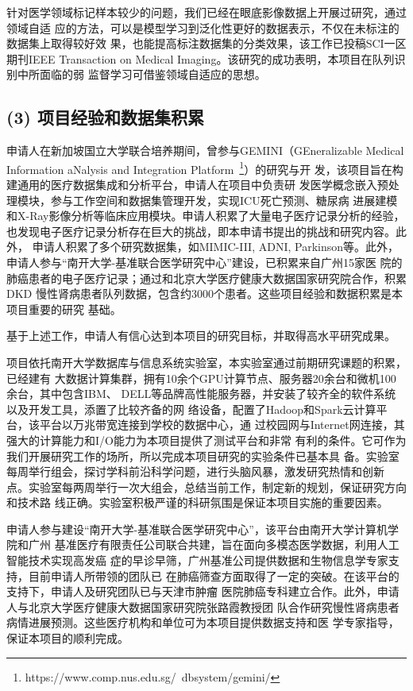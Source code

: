 \documentclass[a4paper,zihao=-4]{article}
\begin{document}
针对医学领域标记样本较少的问题，我们已经在眼底影像数据上开展过研究，通过领域自适
应的方法，可以是模型学习到泛化性更好的数据表示，不仅在未标注的数据集上取得较好效
果，也能提高标注数据集的分类效果，该工作已投稿{\kaishu SCI一区期刊IEEE
Transaction on Medical Imaging}。该研究的成功表明，本项目在队列识别中所面临的弱
监督学习可借鉴领域自适应的思想。

\subsection*{(3) 项目经验和数据集积累}

申请人在新加坡国立大学联合培养期间，曾参与GEMINI（GEneralizable Medical
Information aNalysis and Integration
Platform~\footnote{https://www.comp.nus.edu.sg/~dbsystem/gemini/}）的研究与开
发，该项目旨在构建通用的医疗数据集成和分析平台，{\kaishu 申请人在项目中负责研
发医学概念嵌入预处理模块，参与工作空间和数据集管理开发，实现ICU死亡预测、糖尿病
进展建模和X-Ray影像分析等临床应用模块}。申请人积累了大量电子医疗记录分析的经验，
也发现电子医疗记录分析存在巨大的挑战，即本申请书提出的挑战和研究内容。此外，
{\kaishu 申请人积累了多个研究数据集，如MIMIC-III, ADNI, Parkinson等}。此外，
{\kaishu 申请人参与“南开大学-基准联合医学研究中心”建设}，已积累来自广州15家医
院的肺癌患者的电子医疗记录；通过和北京大学医疗健康大数据国家研究院合作，积累DKD
慢性肾病患者队列数据，包含约3000个患者。这些项目经验和数据积累是本项目重要的研究
基础。

基于上述工作，申请人有信心达到本项目的研究目标，并取得高水平研究成果。


项目依托南开大学数据库与信息系统实验室，本实验室通过前期研究课题的积累，已经建有
大数据计算集群，拥有10余个GPU计算节点、服务器20余台和微机100余台，其中包含IBM、
DELL等品牌高性能服务器，并安装了较齐全的软件系统以及开发工具，添置了比较齐备的网
络设备，配置了Hadoop和Spark云计算平台，该平台以万兆带宽连接到学校的数据中心，通
过校园网与Internet网连接，其强大的计算能力和I/O能力为本项目提供了测试平台和非常
有利的条件。它可作为我们开展研究工作的场所，所以完成本项目研究的实验条件已基本具
备。实验室每周举行组会，探讨学科前沿科学问题，进行头脑风暴，激发研究热情和创新
点。实验室每两周举行一次大组会，总结当前工作，制定新的规划，保证研究方向和技术路
线正确。实验室积极严谨的科研氛围是保证本项目实施的重要因素。

申请人参与建设“南开大学-基准联合医学研究中心”，该平台由南开大学计算机学院和广州
基准医疗有限责任公司联合共建，旨在面向多模态医学数据，利用人工智能技术实现高发癌
症的早诊早筛，广州基准公司提供数据和生物信息学专家支持，目前申请人所带领的团队已
在肺癌筛查方面取得了一定的突破。在该平台的支持下，申请人及研究团队已与天津市肿瘤
医院肺癌专科建立合作。此外，申请人与北京大学医疗健康大数据国家研究院张路霞教授团
队合作研究慢性肾病患者病情进展预测。这些医疗机构和单位可为本项目提供数据支持和医
学专家指导，保证本项目的顺利完成。
\end{document}
